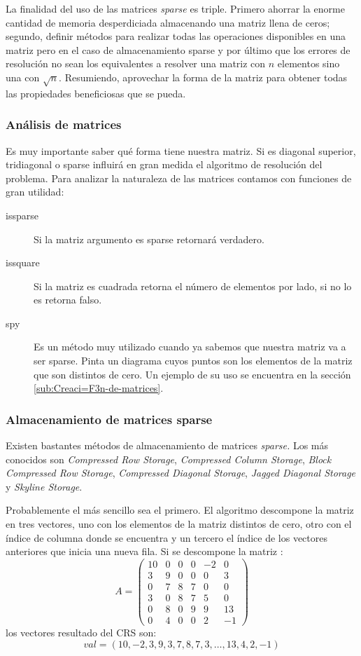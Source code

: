 La finalidad del uso de las matrices \emph{sparse} es triple. Primero
ahorrar la enorme cantidad de memoria desperdiciada almacenando una
matriz llena de ceros; segundo, definir métodos para realizar todas
las operaciones disponibles en una matriz pero en el caso de almacenamiento
sparse y por último que los errores de resolución no sean los equivalentes
a resolver una matriz con $n$ elementos sino una con $\sqrt{n}$.
Resumiendo, aprovechar la forma de la matriz para obtener todas las
propiedades beneficiosas que se pueda.


\subsubsection{Análisis de matrices}

Es muy importante saber qué forma tiene nuestra matriz. Si es diagonal
superior, tridiagonal o sparse influirá en gran medida el algoritmo
de resolución del problema. Para analizar la naturaleza de las matrices
contamos con funciones de gran utilidad:

\begin{description}
\item [issparse]Si la matriz argumento es sparse retornará
verdadero.
\item [issquare]Si la matriz es cuadrada retorna el número
de elementos por lado, si no lo es retorna falso.
\item [spy]Es un método muy utilizado cuando ya sabemos que
nuestra matriz va a ser sparse. Pinta un diagrama cuyos puntos son
los elementos de la matriz que son distintos de cero. Un ejemplo de
su uso se encuentra en la sección \ref{sub:Creaci=F3n-de-matrices}.
\end{description}

\subsubsection{Almacenamiento de matrices sparse}

Existen bastantes métodos de almacenamiento de matrices \emph{sparse.}
Los más conocidos son \emph{Compressed Row Storage}, \emph{Compressed
Column Storage}, \emph{Block Compressed Row Storage}, \emph{Compressed
Diagonal Storage}, \emph{Jagged Diagonal Storage} y \emph{Skyline
Storage}.

Probablemente el más sencillo sea el primero. El algoritmo descompone
la matriz en tres vectores, uno con los elementos de la matriz distintos
de cero, otro con el índice de columna donde se encuentra y un tercero
el índice de los vectores anteriores que inicia una nueva fila. Si
se descompone la matriz :$$
A=\left(\begin{array}{cccccc}
10 & 0 & 0 & 0 & -2 & 0\\
3 & 9 & 0 & 0 & 0 & 3\\
0 & 7 & 8 & 7 & 0 & 0\\
3 & 0 & 8 & 7 & 5 & 0\\
0 & 8 & 0 & 9 & 9 & 13\\
0 & 4 & 0 & 0 & 2 & -1\end{array}\right)$$
los vectores resultado del CRS son:
$$val=(10,-2,3,9,3,7,8,7,3,\ldots,13,4,2,-1)$$

